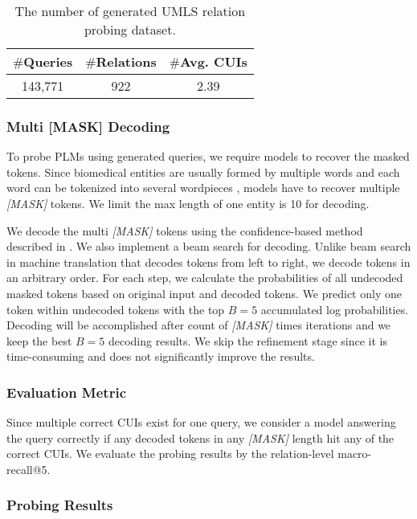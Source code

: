 \documentclass[11pt]{article}
\begin{document}
\begin{table}
\centering
\begin{tabular}{ccc}
\hline
$\#$Queries&$\#$Relations&$\#$Avg. CUIs\\
\hline
143,771&922&2.39\\
\hline
\end{tabular}
\caption{The number of generated UMLS relation probing dataset.}
\label{tab:umls}
\end{table}






\subsubsection{Multi [MASK] Decoding}
To probe PLMs using generated queries, we require models to recover the masked tokens.
Since biomedical entities are usually formed by multiple words and each word can be tokenized into several wordpieces \cite{wu2016google}, models have to recover multiple \textit{[MASK]} tokens.
We limit the max length of one entity is 10 for decoding.

We decode the multi \textit{[MASK]} tokens using the confidence-based method described in \citet{jiang-etal-2020-x}.
We also implement a beam search for decoding.
Unlike beam search in machine translation that decodes tokens from left to right, we decode tokens in an arbitrary order.
For each step, we calculate the probabilities of all undecoded masked tokens based on original input and decoded tokens.
We predict only one token within undecoded tokens with the top $B=5$ accumulated log probabilities.
Decoding will be accomplished after count of \textit{[MASK]} times iterations and we keep the best $B=5$ decoding results.
We skip the refinement stage since it is time-consuming and does not significantly improve the results.


\subsubsection{Evaluation Metric}

Since multiple correct CUIs exist for one query, we consider a model answering the query correctly if any decoded tokens in any \textit{[MASK]} length hit any of the correct CUIs.
We evaluate the probing results by the relation-level macro-recall@5.

\subsubsection{Probing Results}
\end{document}
